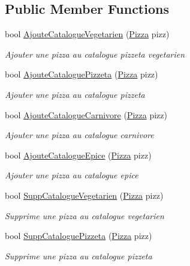 \subsection*{Public Member Functions}
\begin{DoxyCompactItemize}
\item 
bool \hyperlink{classModele_1_1Manager_a43cd3536e67ca0ec0c4da3c8d8498d7d}{Ajoute\+Catalogue\+Vegetarien} (\hyperlink{classModele_1_1Pizza}{Pizza} pizz)
\begin{DoxyCompactList}\small\item\em Ajouter une pizza au catalogue pizzeta vegetarien \end{DoxyCompactList}\item 
bool \hyperlink{classModele_1_1Manager_a154dceeeebd915d9f132e056ce3f0753}{Ajoute\+Catalogue\+Pizzeta} (\hyperlink{classModele_1_1Pizza}{Pizza} pizz)
\begin{DoxyCompactList}\small\item\em Ajouter une pizza au catalogue pizzeta \end{DoxyCompactList}\item 
bool \hyperlink{classModele_1_1Manager_a713c89e0b2559c78652315a5c3e9da8c}{Ajoute\+Catalogue\+Carnivore} (\hyperlink{classModele_1_1Pizza}{Pizza} pizz)
\begin{DoxyCompactList}\small\item\em Ajouter une pizza au catalogue carnivore \end{DoxyCompactList}\item 
bool \hyperlink{classModele_1_1Manager_a902832a7e3612ef3699a66ca6c4db0c5}{Ajoute\+Catalogue\+Epice} (\hyperlink{classModele_1_1Pizza}{Pizza} pizz)
\begin{DoxyCompactList}\small\item\em Ajouter une pizza au catalogue epice \end{DoxyCompactList}\item 
bool \hyperlink{classModele_1_1Manager_a9f7374e98fcff11bea2dc069f2623e41}{Supp\+Catalogue\+Vegetarien} (\hyperlink{classModele_1_1Pizza}{Pizza} pizz)
\begin{DoxyCompactList}\small\item\em Supprime une pizza au catalogue vegetarien \end{DoxyCompactList}\item 
bool \hyperlink{classModele_1_1Manager_ac0e999997599e5694fa82a678c4d2fbe}{Supp\+Catalogue\+Pizzeta} (\hyperlink{classModele_1_1Pizza}{Pizza} pizz)
\begin{DoxyCompactList}\small\item\em Supprime une pizza au catalogue pizzeta \end{DoxyCompactList}\item 

\end{DoxyCompactItemize}
